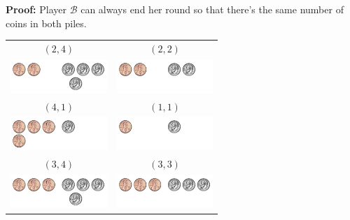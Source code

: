\documentclass{beamer}
\theoremstyle{theorem}
\theoremstyle{definition}
\newcommand{\<}{\langle}
\renewcommand{\>}{\rangle}
\newcommand{\pl}[1]{\mathscr{#1}}
\newcommand{\vpause}{\pause\vspace{1em}}
\begin{document}
\begin{frame}
  \textbf{Proof:} Player $\pl B$ can always end her round so that there's the
  same number of coins in both piles.

  \vpause

  {\small \begin{center}\begin{tabular}{cc}
    $(2,4)$ & $(2,2)$ \\
    \includegraphics[height=0.5in]{nimCoins/24.pdf} &
    \includegraphics[height=0.5in]{nimCoins/22.pdf} \vspace{1em}\\

    $(4,1)$ & $(1,1)$ \\
    \includegraphics[height=0.5in]{nimCoins/41.pdf} &
    \includegraphics[height=0.5in]{nimCoins/11.pdf} \vspace{1em}\\

    $(3,4)$ & $(3,3)$ \\
    \includegraphics[height=0.5in]{nimCoins/34.pdf} &
    \includegraphics[height=0.5in]{nimCoins/33.pdf} \\
  \end{tabular}\end{center} }

\end{frame}
\end{document}
